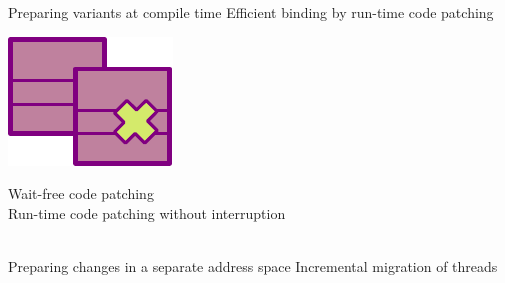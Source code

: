\RequirePackage{luatex85}\documentclass[beamer,xcolor={table,rgb,dvipsnames}]{beamer}
\begin{document}
\begin{frame}
\begin{mdframed}
  \bii
  \ii Preparing variants at compile time
  \ii Efficient binding by run-time code patching
  \eii
\end{mdframed}\vspace{1cm}

\begin{mdframed}[linecolor=luhblue!40,backgroundcolor=wfBG,linewidth=5pt,topline=false,rightline=false,bottomline=false,  innertopmargin=6pt, innerbottommargin=6pt, innerleftmargin=6pt, innerrightmargin=6pt]


  \begin{minipage}{0.1\linewidth}
    \includegraphics[width=\linewidth]{fig/wfpatch.pdf}
  \end{minipage}\hfill%
  \begin{minipage}{0.87\linewidth}
  {\LARGE Wait-free code patching}\\
  {\large Run-time code patching without interruption}
\end{minipage}\\[1.5ex]

  \bii
  \ii Preparing changes in a separate address space
  \ii Incremental migration of threads
  \eii
\end{mdframed}  

\end{frame}
\end{document}
